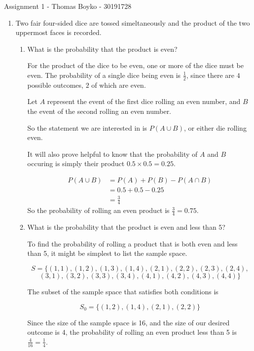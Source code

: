\documentclass{article}
\begin{document}
\huge Assignment 1 - Thomas Boyko - 30191728

\normalsize 

\begin{enumerate} 
\item Two fair four-sided dice are tossed simeltaneously and the product
    of the two uppermost faces is recorded.
    \begin{enumerate}[label= (\alph*)] 
        \item What is the probability that the product is even?

            For the product of the dice to be even, one or more of the dice
            must be even. The probability of a single dice being even is $\frac{1}{2}$,
            since there are $4$ possible outcomes, $2$ of which are even.

            Let $A$ represent the event of the first dice rolling an even number,
            and $B$ the event of the second rolling an even number.

            So the statement we are interested in is $P(A\cup B)$, or either die 
            rolling even.

            It will also prove helpful to know that the probability of $A$ and $B$ 
            occuring is simply their product $0.5\times0.5=0.25$.

            \begin{align*} 
                P(A\cup B)&=P(A)+P(B)-P(A\cap B)\\
                &=0.5+0.5-0.25\\
                &=\frac{3}{4}
            \end{align*}
            So the probability of rolling an even product is $\frac{3}{4}=0.75$.
        \item What is the probability that the product is even and less than 5?

        To find the probability of rolling a product that is both even and less
        than 5, it might be simplest to list the sample space.

        \[S=\{(1,1),(1,2),(1,3),(1,4),(2,1),(2,2),(2,3),(2,4),\]
        \[(3,1),(3,2),(3,3),(3,4),(4,1),(4,2),(4,3),(4,4)\}\]

        The subset of the sample space that satisfies both conditions is 

        \[S_0=\{(1,2),(1,4),(2,1),(2,2)\}\]

        Since the size of the sample space is 16, and the size of our desired
        outcome is 4, the probability of rolling an even product less than 5
        is $\frac{4}{16}=\frac{1}{4}$.


\end{enumerate}
\end{enumerate}
\end{document}
